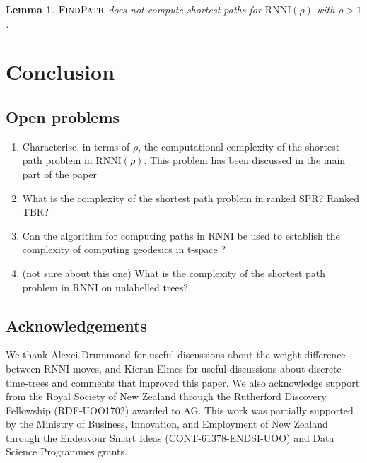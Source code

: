 \documentclass[11pt]{amsart}
\newtheorem{lemma}{Lemma}
\newcommand{\rnni}{\mathrm{RNNI}}
\newcommand{\findpath}{\textsc{FindPath}}
\newcommand{\spr}{\mathrm{SPR}}
\newcommand{\tbr}{\mathrm{TBR}}
\newcommand{\summary}[1]{} %
\begin{document}
\begin{lemma}
	$\findpath$ does not compute shortest paths for $\rnni(\rho)$ with $\rho > 1$.
\end{lemma}


\section{Conclusion}

\summary{Open problems and Acknowledgements.
This section goes after the 10 pages.}

\subsection{Open problems}

\begin{enumerate}
\item Characterise, in terms of $\rho$, the computational complexity of the shortest path problem in $\rnni(\rho)$.
This problem has been discussed in the main part of the paper

\item What is the complexity of the shortest path problem in ranked $\spr$? Ranked $\tbr$?

\item Can the algorithm for computing paths in $\rnni$ be used to establish the complexity of computing geodesics in t-space \autocite{Gavryushkin2016-uu}?

\item (not sure about this one) What is the complexity of the shortest path problem in RNNI on unlabelled trees?
\end{enumerate}

\subsection{Acknowledgements}

We thank Alexei Drummond for useful discussions about the weight difference between $\rnni$ moves, and Kieran Elmes for useful discussions about discrete time-trees and comments that improved this paper.
We also acknowledge support from the Royal Society of New Zealand through the Rutherford Discovery Fellowship (RDF-UOO1702) awarded to AG.
This work was partially supported by the Ministry of Business, Innovation, and Employment of New Zealand through the Endeavour Smart Ideas (CONT-61378-ENDSI-UOO) and Data Science Programmes grants.

\newpage


\printbibliography
\end{document}
